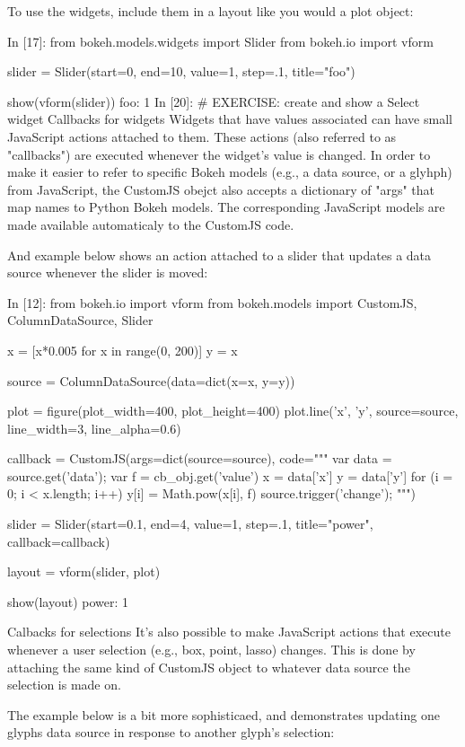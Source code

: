 To use the widgets, include them in a layout like you would a plot object:

In [17]:
from bokeh.models.widgets import Slider
from bokeh.io import vform

slider = Slider(start=0, end=10, value=1, step=.1, title="foo")

show(vform(slider))
foo:  
1
In [20]:
# EXERCISE: create and show a Select widget 
Callbacks for widgets
Widgets that have values associated can have small JavaScript actions attached to them. These actions (also referred to as "callbacks") are executed whenever the widget's value is changed. In order to make it easier to refer to specific Bokeh models (e.g., a data source, or a glyhph) from JavaScript, the CustomJS obejct also accepts a dictionary of "args" that map names to Python Bokeh models. The corresponding JavaScript models are made available automaticaly to the CustomJS code.

And example below shows an action attached to a slider that updates a data source whenever the slider is moved:

In [12]:
from bokeh.io import vform
from bokeh.models import CustomJS, ColumnDataSource, Slider

x = [x*0.005 for x in range(0, 200)]
y = x

source = ColumnDataSource(data=dict(x=x, y=y))

plot = figure(plot_width=400, plot_height=400)
plot.line('x', 'y', source=source, line_width=3, line_alpha=0.6)

callback = CustomJS(args=dict(source=source), code="""
    var data = source.get('data');
    var f = cb_obj.get('value')
    x = data['x']
    y = data['y']
    for (i = 0; i < x.length; i++) {
        y[i] = Math.pow(x[i], f)
    }
    source.trigger('change');
""")

slider = Slider(start=0.1, end=4, value=1, step=.1, title="power", callback=callback)

layout = vform(slider, plot)

show(layout)
power:  
1
 	
Calbacks for selections
It's also possible to make JavaScript actions that execute whenever a user selection (e.g., box, point, lasso) changes. This is done by attaching the same kind of CustomJS object to whatever data source the selection is made on.

The example below is a bit more sophisticaed, and demonstrates updating one glyphs data source in response to another glyph's selection:

